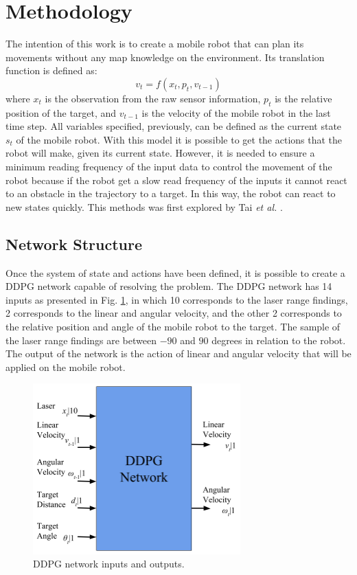 \section*{Methodology}

The intention of this work is to create a mobile robot that can plan its movements without any map knowledge on the environment. Its translation function is defined as:
\begin{equation}
v_t = f(x_t, p_t, v_{t-1})
\end{equation}
where $x_t$ is the observation from the raw sensor information, $p_t$ is the relative position of the target, and $v_{t-1}$ is the velocity of the mobile robot in the last time step.
All variables specified, previously, can be defined as the current state $s_t$ of the mobile robot.
With this model it is possible to get the actions that the robot will make, given its current state.
However, it is needed to ensure a minimum reading frequency of the input data to control the movement of the robot because if the robot get a slow read frequency of the inputs it cannot react to an obstacle in the trajectory to a target. In this way, the robot can react to new states quickly.
This methods was first explored by Tai \textit{et al.} \cite{tai2017virtual}.

\subsection*{Network Structure}

Once the system of state and actions have been defined, it is possible to create a DDPG network capable of resolving the problem.
The DDPG network has 14 inputs as presented in Fig. \ref{fig:entradaESaida}, in which 10 corresponds to the laser range findings, 2 corresponds to the linear and angular velocity, and the other 2 corresponds to the relative position and angle of the mobile robot to the target.
The sample of the laser range findings are between $-90$ and $90$ degrees in relation to the robot. The output of the network is the action of linear and angular velocity that will be applied on the mobile robot.

\begin{figure}[H]
\centerline{\includegraphics[width=8cm]{images/o_and_i.png}}
\caption{DDPG network inputs and outputs.}
\label{fig:entradaESaida}
\end{figure}

